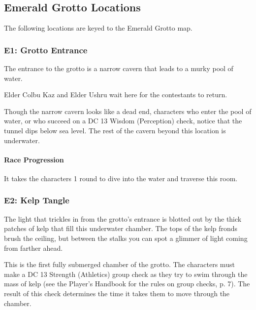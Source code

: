 \documentclass[letterpaper, 11pt, bg=full, twocolumn]{dndbook}
\begin{document}
\subsection{Emerald Grotto Locations}

The following locations are keyed to the Emerald Grotto map.



\subsubsection{E1: Grotto Entrance}

\begin{DndReadAloud}
The entrance to the grotto is a narrow cavern that leads to a murky pool of water.
\end{DndReadAloud}

Elder Colbu Kaz and Elder Ushru wait here for the contestants to return.

Though the narrow cavern looks like a dead end, characters who enter the pool of water, or who succeed on a DC 13 Wisdom (Perception) check, notice that the tunnel dips below sea level. The rest of the cavern beyond this location is underwater.

\paragraph{Race Progression}

It takes the characters 1 round to dive into the water and traverse this room.

\subsubsection{E2: Kelp Tangle}

\begin{DndReadAloud}
The light that trickles in from the grotto's entrance is blotted out by the thick patches of kelp that fill this underwater chamber. The tops of the kelp fronds brush the ceiling, but between the stalks you can spot a glimmer of light coming from farther ahead.
\end{DndReadAloud}

This is the first fully submerged chamber of the grotto. The characters must make a DC 13 Strength (Athletics) group check as they try to swim through the mass of kelp (see the Player's Handbook for the rules on group checks, p. 7). The result of this check determines the time it takes them to move through the chamber.
\end{document}
